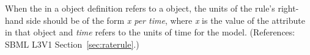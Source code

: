 When the  in a \RateRule object definition refers to a
\Compartment object, the units of the rule's right-hand side should be of
the form \emph{x per time}, where \emph{x} is the value of the
 attribute in that \Compartment object and \emph{time} refers
to the units of time for the model.  (References: SBML L3V1
Section~\ref{sec:raterule}.)

